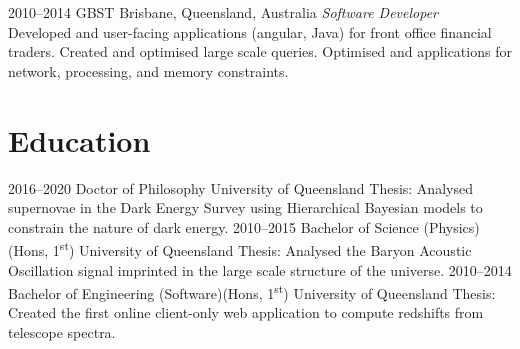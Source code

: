 \documentclass[]{friggeri-cv2}
\begin{document}
\begin{entrylist}
\entry
{2010--2014}
{GBST}
{Brisbane, Queensland, Australia}
{\emph{Software Developer} \\
Developed  and user-facing applications (angular, Java) 
for front office financial traders. Created and optimised large scale  queries. 
Optimised  and applications for network, processing, and memory constraints.}

\end{entrylist}


\section{Education}

\begin{entrylist}
\entry
{2016--2020}
{Doctor of Philosophy}
{University of Queensland}
{Thesis: Analysed supernovae in the Dark Energy Survey using Hierarchical Bayesian models to constrain the nature of dark energy.}
\entry
{2010--2015}
{Bachelor of Science {\normalfont (Physics)(Hons, 1\textsuperscript{st})}}
{University of Queensland}
{Thesis: Analysed the Baryon Acoustic Oscillation signal imprinted in the large scale structure of the universe.}
\entry
{2010--2014}
{Bachelor of Engineering {\normalfont (Software)(Hons, 1\textsuperscript{st})}}
{University of Queensland}
{Thesis: Created the first online client-only web application to compute redshifts from telescope spectra. }
\end{entrylist}
\end{document}

